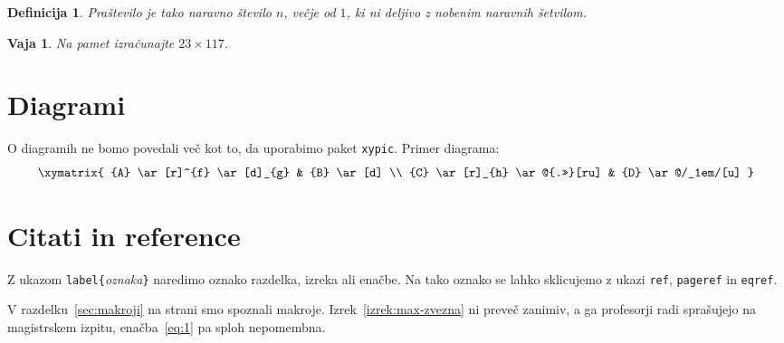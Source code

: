 \documentclass{amsart}
\newtheorem{definicija}{Definicija}
\newtheorem{vaja}[izrek]{Vaja}
\begin{document}
\begin{definicija}
  \emph{Praštevilo} je tako naravno število $n$, večje od $1$, ki ni deljivo z nobenim
  naravnih šetvilom.
\end{definicija}

\begin{vaja}
  Na pamet izračunajte $23 \times 117$.
\end{vaja}

\section{Diagrami}
\label{sec:diagrami}

O diagramih ne bomo povedali več kot to, da uporabimo paket \texttt{xypic}. Primer diagrama:
%
\begin{equation*}
  \xymatrix{
    {A}
    \ar[r]^{f}
    \ar[d]_{g}
    &
    {B}
    \ar[d]
    \\
    {C}
    \ar[r]_{h}
    \ar@{.>>}[ru]
    &
    {D}
    \ar@/_1em/[u]
  }
\end{equation*}

\section{Citati in reference}
\label{sec:citati}

Z ukazom \verb|label{|\emph{oznaka}\verb|}| naredimo oznako razdelka, izreka ali enačbe. Na tako oznako se lahko sklicujemo z ukazi \verb|ref|, \verb|pageref| in \verb|eqref|.

V razdelku~\ref{sec:makroji} na strani \pageref{sec:makroji} smo spoznali makroje.
Izrek~\ref{izrek:max-zvezna} ni preveč zanimiv, a ga profesorji radi sprašujejo na
magistrskem izpitu, enačba~\eqref{eq:1} pa sploh nepomembna.
\end{document}
